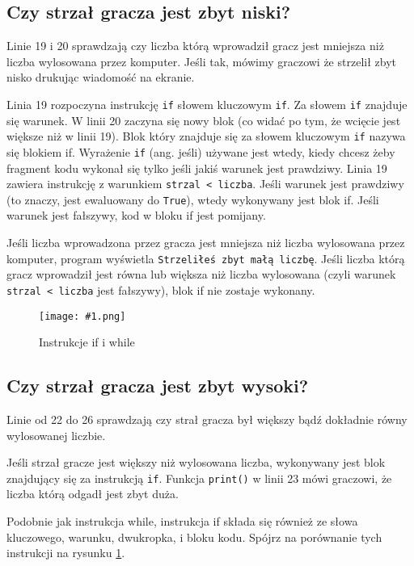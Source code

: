 \documentclass{book}
\newcommand{\img}[3]{
\begin{figure}
\centerline{
	\texttt{[image: \#1.png]}
}
\caption{#2}
\label{#1}
\end{figure}
}
\begin{document}
\subsection{Czy strzał gracza jest zbyt niski?}

Linie 19 i 20 sprawdzają czy liczba którą wprowadził gracz jest mniejsza niż liczba wylosowana przez komputer. Jeśli tak, mówimy graczowi że strzelił zbyt nisko drukując wiadomość na ekranie.



Linia 19 rozpoczyna instrukcję \lstinline{if} słowem kluczowym \lstinline{if}. Za słowem \lstinline{if} znajduje się warunek. W linii 20 zaczyna się nowy blok (co widać po tym, że wcięcie jest większe niż w linii 19). Blok który znajduje się za słowem kluczowym \lstinline{if} nazywa się blokiem if. Wyrażenie \lstinline{if} (ang. jeśli) używane jest wtedy, kiedy chcesz żeby fragment kodu wykonał się tylko jeśli jakiś warunek jest prawdziwy. Linia 19 zawiera instrukcję z warunkiem \lstinline{strzal < liczba}. Jeśli warunek jest prawdziwy (to znaczy, jest ewaluowany do \lstinline{True}), wtedy wykonywany jest blok if. Jeśli warunek jest fałszywy, kod w bloku if jest pomijany.

Jeśli liczba wprowadzona przez gracza jest mniejsza niż liczba wylosowana przez komputer, program wyświetla \lstinline{Strzeliłeś zbyt małą liczbę}. Jeśli liczba którą gracz wprowadził jest równa lub większa niż liczba wylosowana (czyli warunek \lstinline{strzal < liczba} jest fałszywy), blok if nie zostaje wykonany.

\img{guess-keyword-condition}{Instrukcje if i while}{7 cm}

\subsection{Czy strzał gracza jest zbyt wysoki?}

Linie od 22 do 26 sprawdzają czy strał gracza był większy bądź dokładnie równy wylosowanej liczbie.



Jeśli strzał gracze jest większy niż wylosowana liczba, wykonywany jest blok znajdujący się za instrukcją \lstinline{if}. Funkcja \lstinline{print()} w linii 23 mówi graczowi, że liczba którą odgadł jest zbyt duża.

Podobnie jak instrukcja while, instrukcja if składa się również ze słowa kluczowego, warunku, dwukropka, i bloku kodu. Spójrz na porównanie tych instrukcji na rysunku \ref{guess-keyword-condition}.
\end{document}
